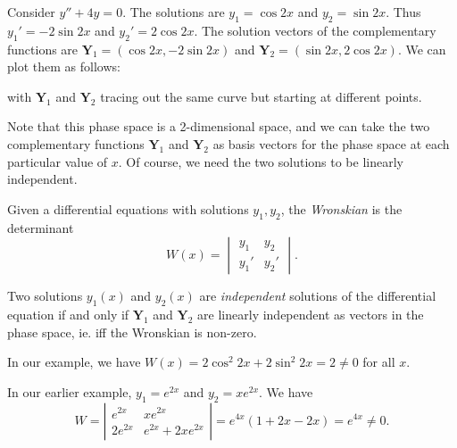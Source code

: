 \documentclass[a4paper]{article}
\begin{document}
\begin{eg}
  Consider $y'' + 4y = 0$. The solutions are $y_1 = \cos 2x$ and $y_2 = \sin 2x$. Thus $y_1' = -2\sin 2x$ and $y_2' = 2\cos 2x$. The solution vectors of the complementary functions are $\mathbf{Y}_1 = (\cos 2x, -2\sin 2x)$ and $\mathbf{Y}_2 = (\sin 2x, 2\cos 2x)$. We can plot them as follows:
  \begin{center}
  \end{center}
  with $\mathbf{Y}_1$ and $\mathbf{Y}_2$ tracing out the same curve but starting at different points.
\end{eg}

Note that this phase space is a 2-dimensional space, and we can take the two complementary functions $\mathbf{Y}_1$ and $\mathbf{Y}_2$ as basis vectors for the phase space at each particular value of $x$. Of course, we need the two solutions to be linearly independent.

\begin{defi}[Wronskian]
  Given a differential equations with solutions $y_1, y_2$, the \emph{Wronskian} is the determinant
  \[
    W(x) = \begin{vmatrix}y_1 & y_2 \\ y_1' & y_2'\end{vmatrix}.
  \]
\end{defi}
\begin{defi}
  Two solutions $y_1(x)$ and $y_2(x)$ are \emph{independent} solutions of the differential equation if and only if $\mathbf{Y}_1$ and $\mathbf{Y}_2$ are linearly independent as vectors in the phase space, ie. iff the Wronskian is non-zero.
\end{defi}

In our example, we have $W(x) = 2\cos^2 2x + 2\sin^2 2x = 2 \not= 0$ for all $x$.

\begin{eg}
  In our earlier example, $y_1 = e^{2x}$ and $y_2 = xe^{2x}$. We have
  \[
    W = \left|\begin{matrix} e^{2x} & xe^{2x}\\ 2e^{2x} & e^{2x} + 2xe^{2x} \end{matrix}\right| = e^{4x}(1 + 2x - 2x) = e^{4x} \not= 0.
  \]
\end{eg}
\end{document}
